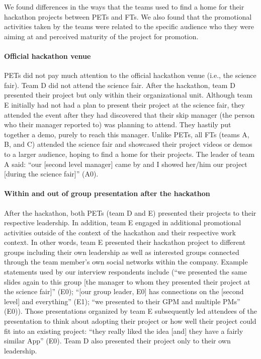 \documentclass{hcij}
\begin{document}
We found differences in the ways that the teams used to find a home for their hackathon projects between PETs and FTs. We also found that the promotional activities taken by the teams were related to the specific audience who they were aiming at and perceived maturity of the project for promotion.

\paragraph{Official hackathon venue}
PETs did not pay much attention to the official hackathon venue (i.e., the science fair). Team D did not attend the science fair. After the hackathon, team D presented their project but only within their organizational unit. Although team E initially had not had a plan to present their project at the science fair, they attended the event after they had discovered that their skip manager (the person who their manager reported to) was planning to attend. They hastily put together a demo, purely to reach this manager.
Unlike PETs, all FTs (teams A, B, and C) attended the science fair and showcased their project videos or demos to a larger audience, hoping to find a home for their projects. The leader of team A said: “our [second level manager] came by and I showed her/him our project [during the science fair]” (A0).

\paragraph{Within and out of group presentation after the hackathon}
After the hackathon, both PETs (team D and E) presented their projects to their respective leadership. In addition, team E engaged in additional promotional activities outside of the context of the hackathon and their respective work context. In other words, team E presented their hackathon project to different groups including their own leadership as well as interested groups connected through the team member’s own social networks within the company. Example statements used by our interview respondents include (“we presented the same slides again to this group [the manager to whom they presented their project at the science fair]” (E0); “[our group leader, E0] has connections on the [second level] and everything” (E1); “we presented to their GPM and multiple PMs” (E0)). Those presentations organized by team E subsequently led attendees of the presentation to think about adopting their project or how well their project could fit into an existing project: “they really liked the idea [and] they have a fairly similar App” (E0). Team D also presented their project only to their own leadership.
\end{document}
